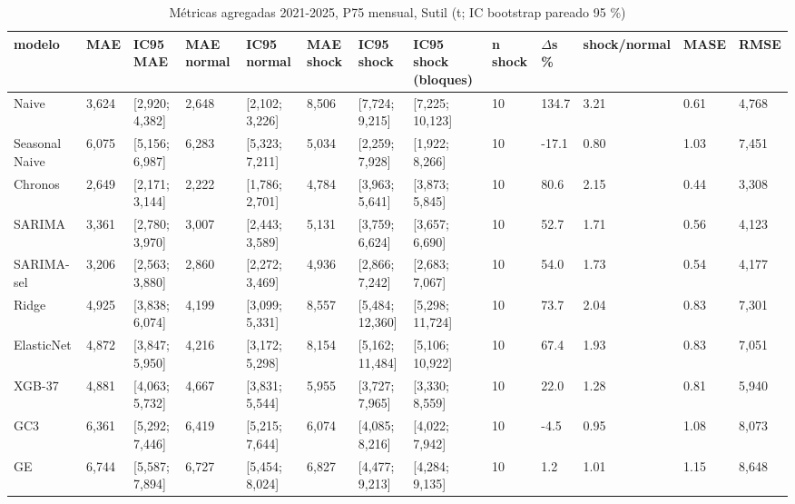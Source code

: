 \begin{table}[H]
\centering
\small
\caption{Métricas agregadas 2021-2025, P75 mensual, Sutil (t; IC bootstrap pareado 95 \%)}
\label{tab:T06_agregadas_P75_principal_2021_2025_sutil}
\begin{tabular}{lllllllllllll}
\toprule
modelo & MAE & IC95 MAE & MAE normal & IC95 normal & MAE shock & IC95 shock & IC95 shock (bloques) & n shock & $\Delta$s \% & shock/normal & MASE & RMSE \\
\midrule
Naive & 3,624 & [2,920; 4,382] & 2,648 & [2,102; 3,226] & 8,506 & [7,724; 9,215] & [7,225; 10,123] & 10 & 134.7 & 3.21 & 0.61 & 4,768 \\
Seasonal Naive & 6,075 & [5,156; 6,987] & 6,283 & [5,323; 7,211] & 5,034 & [2,259; 7,928] & [1,922; 8,266] & 10 & -17.1 & 0.80 & 1.03 & 7,451 \\
Chronos & 2,649 & [2,171; 3,144] & 2,222 & [1,786; 2,701] & 4,784 & [3,963; 5,641] & [3,873; 5,845] & 10 & 80.6 & 2.15 & 0.44 & 3,308 \\
SARIMA & 3,361 & [2,780; 3,970] & 3,007 & [2,443; 3,589] & 5,131 & [3,759; 6,624] & [3,657; 6,690] & 10 & 52.7 & 1.71 & 0.56 & 4,123 \\
SARIMA-sel & 3,206 & [2,563; 3,880] & 2,860 & [2,272; 3,469] & 4,936 & [2,866; 7,242] & [2,683; 7,067] & 10 & 54.0 & 1.73 & 0.54 & 4,177 \\
Ridge & 4,925 & [3,838; 6,074] & 4,199 & [3,099; 5,331] & 8,557 & [5,484; 12,360] & [5,298; 11,724] & 10 & 73.7 & 2.04 & 0.83 & 7,301 \\
ElasticNet & 4,872 & [3,847; 5,950] & 4,216 & [3,172; 5,298] & 8,154 & [5,162; 11,484] & [5,106; 10,922] & 10 & 67.4 & 1.93 & 0.83 & 7,051 \\
XGB-37 & 4,881 & [4,063; 5,732] & 4,667 & [3,831; 5,544] & 5,955 & [3,727; 7,965] & [3,330; 8,559] & 10 & 22.0 & 1.28 & 0.81 & 5,940 \\
GC3 & 6,361 & [5,292; 7,446] & 6,419 & [5,215; 7,644] & 6,074 & [4,085; 8,216] & [4,022; 7,942] & 10 & -4.5 & 0.95 & 1.08 & 8,073 \\
GE & 6,744 & [5,587; 7,894] & 6,727 & [5,454; 8,024] & 6,827 & [4,477; 9,213] & [4,284; 9,135] & 10 & 1.2 & 1.01 & 1.15 & 8,648 \\
\bottomrule
\end{tabular}
\end{table}